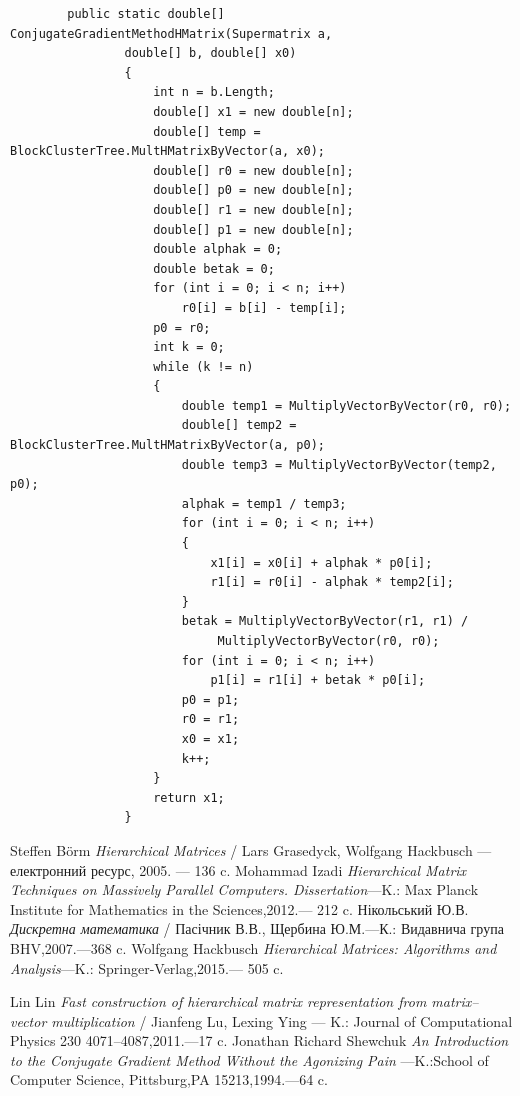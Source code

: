 \documentclass[12pt]{report}
\begin{document}
\begin{enumerate}
\begin{verbatim}
		public static double[] ConjugateGradientMethodHMatrix(Supermatrix a, 
				double[] b, double[] x0)
		        {
		            int n = b.Length;
		            double[] x1 = new double[n];
		            double[] temp = BlockClusterTree.MultHMatrixByVector(a, x0);
		            double[] r0 = new double[n];
		            double[] p0 = new double[n];
		            double[] r1 = new double[n];
		            double[] p1 = new double[n];
		            double alphak = 0;
		            double betak = 0;
		            for (int i = 0; i < n; i++)
		                r0[i] = b[i] - temp[i];
		            p0 = r0;
		            int k = 0;
		            while (k != n)
		            {
		                double temp1 = MultiplyVectorByVector(r0, r0);
		                double[] temp2 = BlockClusterTree.MultHMatrixByVector(a, p0);
		                double temp3 = MultiplyVectorByVector(temp2, p0);
		                alphak = temp1 / temp3;
		                for (int i = 0; i < n; i++)
		                {
		                    x1[i] = x0[i] + alphak * p0[i];
		                    r1[i] = r0[i] - alphak * temp2[i];
		                }
		                betak = MultiplyVectorByVector(r1, r1) /
		                	 MultiplyVectorByVector(r0, r0);
		                for (int i = 0; i < n; i++)
		                    p1[i] = r1[i] + betak * p0[i];
		                p0 = p1;
		                r0 = r1;
		                x0 = x1;
		                k++;
		            }
		            return x1;
		        }
		\end{verbatim}
	\end{enumerate}
	\newpage
	\begin{thebibliography}{00}
	\normalsize{
	    	Steffen B\"orm {\it Hierarchical Matrices} / Lars Grasedyck, Wolfgang Hackbusch --- електронний ресурс, 2005. --- 136 c.
			Mohammad Izadi {\it Hierarchical Matrix Techniques on Massively Parallel Computers. Dissertation}---K.: Max Planck Institute for Mathematics in the Sciences,2012.--- 212 c.
			Нікольський Ю.В. {\it Дискретна математика} / Пасічник В.В., Щербина Ю.М.---К.: Видавнича група BHV,2007.---368 c.
			 Wolfgang Hackbusch {\it Hierarchical Matrices: Algorithms and Analysis}---K.: Springer-Verlag,2015.--- 505 c.
		
			Lin Lin {\it Fast construction of hierarchical matrix representation from matrix–vector
			multiplication } /  Jianfeng Lu, Lexing Ying --- K.: Journal of Computational Physics 230 4071–4087,2011.---17 c.
			Jonathan Richard Shewchuk {\it An Introduction to the Conjugate Gradient Method Without the Agonizing Pain }---K.:School of Computer Science, Pittsburg,PA 15213,1994.---64 c. 	 
	}
	\end{thebibliography}	
\end{document}

